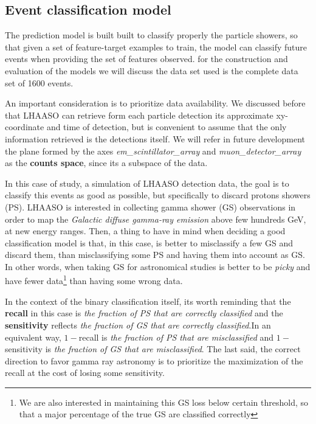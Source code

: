 \documentclass{article}
\begin{document}
\subsection{Event classification model}
The prediction model is built built to classify properly the particle showers, so that given a set of feature-target examples to train, the model can classify future events when providing the set of features observed. for the construction and evaluation of the models we will discuss the data set used is the complete data set of 1600 events.

An important consideration is to prioritize data availability. We discussed before that LHAASO can retrieve form each particle detection its approximate xy-coordinate and time of detection, but is convenient to assume that the only information retrieved is the detections itself. We will refer in future development the plane formed by the axes \emph{em\_scintillator\_array} and \emph{muon\_detector\_array} as the \textbf{counts space}, since its a subspace of the data. 

In this case of study, a simulation of LHAASO detection data, the goal is to classify this events as good as possible, but specifically to discard protons showers (PS).  LHAASO is interested in collecting gamma shower (GS) observations in order to map the \textit{Galactic diffuse gamma-ray emission} above few hundreds GeV, at new energy ranges. Then, a thing to have in mind when deciding a good classification model is that, in this case, is better to misclassify a few GS and discard them, than misclassifying some PS and having them into account as GS. In other words, when taking GS for astronomical studies is better to be \textit{picky} and have fewer data\footnote{We are also interested in maintaining this GS loss below certain threshold, so that a major percentage of the true GS are classified correctly} than having some wrong data. 

In the context of the binary classification itself, its worth reminding that the \textbf{recall} in this case is \textit{the fraction of PS that are correctly classified} and the \textbf{sensitivity} reflects \textit{the fraction of GS that are correctly classified}.In an equivalent way, $1-$recall is \textit{the fraction of PS that are misclassified} and $1-$sensitivity is \textit{the fraction of GS that are misclassified}. The last said, the correct direction to favor gamma ray astronomy is to prioritize the maximization of the recall at the cost of losing some sensitivity.
\end{document}
